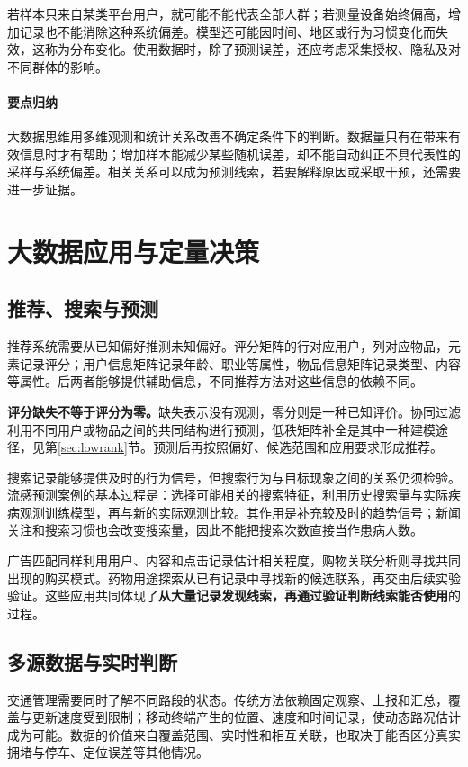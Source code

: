 \documentclass[UTF8,fontset=fandol,a4paper,12pt]{ctexart}
\theoremstyle{definition}
\begin{document}
若样本只来自某类平台用户，就可能不能代表全部人群；若测量设备始终偏高，增加记录也不能消除这种系统偏差。模型还可能因时间、地区或行为习惯变化而失效，这称为分布变化。使用数据时，除了预测误差，还应考虑采集授权、隐私及对不同群体的影响。

\paragraph{要点归纳}
大数据思维用多维观测和统计关系改善不确定条件下的判断。数据量只有在带来有效信息时才有帮助；增加样本能减少某些随机误差，却不能自动纠正不具代表性的采样与系统偏差。相关关系可以成为预测线索，若要解释原因或采取干预，还需要进一步证据。

\section{大数据应用与定量决策}\label{sec:cases}
\subsection{推荐、搜索与预测}
推荐系统需要从已知偏好推测未知偏好。评分矩阵的行对应用户，列对应物品，元素记录评分；用户信息矩阵记录年龄、职业等属性，物品信息矩阵记录类型、内容等属性。后两者能够提供辅助信息，不同推荐方法对这些信息的依赖不同。

\textbf{评分缺失不等于评分为零。}缺失表示没有观测，零分则是一种已知评价。协同过滤利用不同用户或物品之间的共同结构进行预测，低秩矩阵补全是其中一种建模途径，见第\ref{sec:lowrank}节。预测后再按照偏好、候选范围和应用要求形成推荐。

搜索记录能够提供及时的行为信号，但搜索行为与目标现象之间的关系仍须检验。流感预测案例的基本过程是：选择可能相关的搜索特征，利用历史搜索量与实际疾病观测训练模型，再与新的实际观测比较。其作用是补充较及时的趋势信号；新闻关注和搜索习惯也会改变搜索量，因此不能把搜索次数直接当作患病人数。

广告匹配同样利用用户、内容和点击记录估计相关程度，购物关联分析则寻找共同出现的购买模式。药物用途探索从已有记录中寻找新的候选联系，再交由后续实验验证。这些应用共同体现了\textbf{从大量记录发现线索，再通过验证判断线索能否使用}的过程。

\subsection{多源数据与实时判断}
交通管理需要同时了解不同路段的状态。传统方法依赖固定观察、上报和汇总，覆盖与更新速度受到限制；移动终端产生的位置、速度和时间记录，使动态路况估计成为可能。数据的价值来自覆盖范围、实时性和相互关联，也取决于能否区分真实拥堵与停车、定位误差等其他情况。
\end{document}
